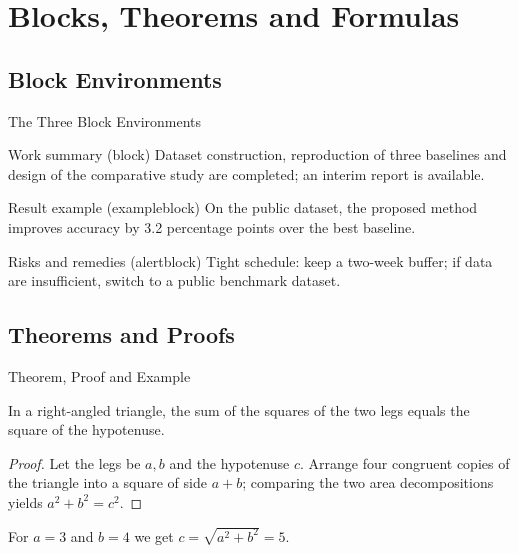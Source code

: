 \section{Blocks, Theorems and Formulas}

\subsection{Block Environments}

\begin{frame}{The Three Block Environments}
  \begin{block}{Work summary (block)}
    Dataset construction, reproduction of three baselines and design of the
    comparative study are completed; an interim report is available.
  \end{block}
  \begin{exampleblock}{Result example (exampleblock)}
    On the public dataset, the proposed method improves accuracy by
    3.2 percentage points over the best baseline.
  \end{exampleblock}
  \begin{alertblock}{Risks and remedies (alertblock)}
    Tight schedule: keep a two-week buffer; if data are insufficient, switch to
    a public benchmark dataset.
  \end{alertblock}
\end{frame}

\subsection{Theorems and Proofs}

\begin{frame}{Theorem, Proof and Example}
  \begin{theorem}
    In a right-angled triangle, the sum of the squares of the two legs equals
    the square of the hypotenuse.
  \end{theorem}
  \begin{proof}
    Let the legs be $a,b$ and the hypotenuse $c$. Arrange four congruent copies
    of the triangle into a square of side $a+b$; comparing the two area
    decompositions yields $a^2+b^2=c^2$.
  \end{proof}
  \begin{example}
    For $a=3$ and $b=4$ we get $c=\sqrt{a^2+b^2}=5$.
  \end{example}
\end{frame}

